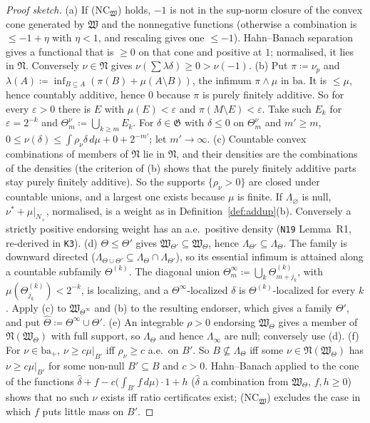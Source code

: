 \documentclass[11pt]{article}
\theoremstyle{definition}
\theoremstyle{remark}
\newcommand{\src}[1]{\texttt{#1}}
\begin{document}
\begin{proof}[Proof sketch]
(a) If (NC$_{\mathfrak W}$) holds, $-1$ is not in the sup-norm closure of the convex cone generated by $\mathfrak W$ and the nonnegative functions (otherwise a combination is $\le-1+\eta$ with $\eta<1$, and rescaling gives one $\le-1$). Hahn--Banach separation gives a functional that is $\ge0$ on that cone and positive at $1$; normalised, it lies in $\mathfrak N$. Conversely $\nu\in\mathfrak N$ gives $\nu(\sum\lambda\delta)\ge0>\nu(-1)$. (b) Put $\pi\coloneqq\nu_p$ and $\lambda(A)\coloneqq\inf_{B\subseteq A}(\pi(B)+\mu(A\setminus B))$, the infimum $\pi\wedge\mu$ in $\mathrm{ba}$. It is $\le\mu$, hence countably additive, hence $0$ because $\pi$ is purely finitely additive. So for every $\varepsilon>0$ there is $E$ with $\mu(E)<\varepsilon$ and $\pi(M\setminus E)<\varepsilon$. Take such $E_k$ for $\varepsilon=2^{-k}$ and $\Theta^\nu_m\coloneqq\bigcup_{k\ge m}E_k$. For $\delta\in\mathfrak G$ with $\delta\le0$ on $\Theta^\nu_m$ and $m'\ge m$, $0\le\nu(\delta)\le\int\rho_\nu\delta\,d\mu+0+2^{-m'}$; let $m'\to\infty$. (c) Countable convex combinations of members of $\mathfrak N$ lie in $\mathfrak N$, and their densities are the combinations of the densities (the criterion of (b) shows that the purely finitely additive parts stay purely finitely additive). So the supports $\{\rho_\nu>0\}$ are closed under countable unions, and a largest one exists because $\mu$ is finite. If $\Lambda_\varnothing$ is null, $\nu^*+\mu|_{N_+}$, normalised, is a weight as in Definition~\ref{def:addup}(b). Conversely a strictly positive endorsing weight has an a.e.\ positive density (\src{N19} Lemma~R1, re-derived in \src{K3}). (d) $\Theta\le\Theta'$ gives $\mathfrak W_{\Theta'}\subseteq\mathfrak W_\Theta$, hence $\Lambda_{\Theta'}\subseteq\Lambda_\Theta$. The family is downward directed ($\Lambda_{\Theta\cup\Theta'}\subseteq\Lambda_\Theta\cap\Lambda_{\Theta'}$), so its essential infimum is attained along a countable subfamily $\Theta^{(k)}$. The diagonal union $\Theta^\infty_m\coloneqq\bigcup_k\Theta^{(k)}_{m+j_k}$, with $\mu(\Theta^{(k)}_{j_k})<2^{-k}$, is localizing, and a $\Theta^\infty$-localized $\delta$ is $\Theta^{(k)}$-localized for every $k$. Apply (c) to $\mathfrak W_{\Theta^\infty}$ and (b) to the resulting endorser, which gives a family $\Theta'$, and put $\hat\Theta\coloneqq\Theta^\infty\cup\Theta'$. (e) An integrable $\rho>0$ endorsing $\mathfrak W_\Theta$ gives a member of $\mathfrak N(\mathfrak W_\Theta)$ with full support, so $\Lambda_\Theta$ and hence $\Lambda_\infty$ are null; conversely use (d). (f) For $\nu\in\mathrm{ba}_+$, $\nu\ge c\mu|_{B'}$ iff $\rho_\nu\ge c$ a.e.\ on $B'$. So $B\not\subseteq\Lambda_\Theta$ iff some $\nu\in\mathfrak N(\mathfrak W_\Theta)$ has $\nu\ge c\mu|_{B'}$ for some non-null $B'\subseteq B$ and $c>0$. Hahn--Banach applied to the cone of the functions $\hat\delta+f-c\bigl(\int_{B'}f\,d\mu\bigr)\cdot1+h$ ($\hat\delta$ a combination from $\mathfrak W_\Theta$, $f,h\ge0$) shows that no such $\nu$ exists iff ratio certificates exist; (NC$_{\mathfrak W}$) excludes the case in which $f$ puts little mass on $B'$.
\end{proof}
\end{document}

